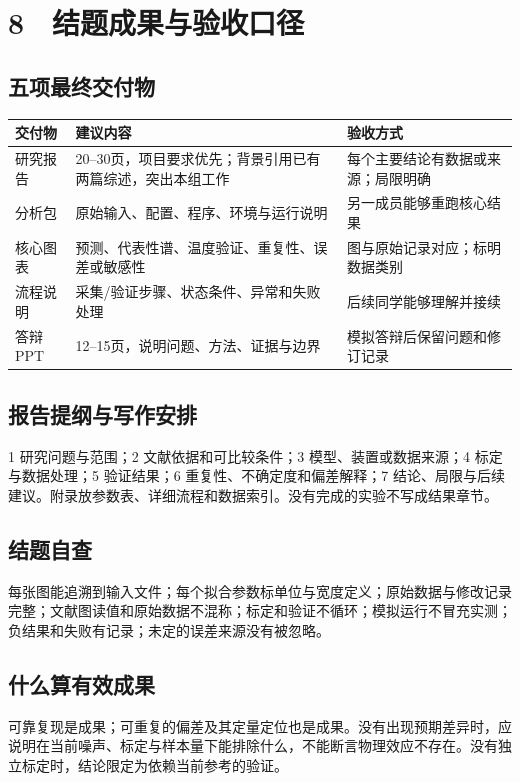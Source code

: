 \documentclass[UTF8,a4paper,11pt,fontset=fandol]{ctexart}
\begin{document}
\clearpage
\section*{8　结题成果与验收口径}
\subsection*{五项最终交付物}
\begin{longtable}{P{2.1cm}P{7.0cm}P{5.0cm}}
\toprule
\textbf{交付物} & \textbf{建议内容} & \textbf{验收方式}\\\midrule\endhead
研究报告 & 20–30页，项目要求优先；背景引用已有两篇综述，突出本组工作 & 每个主要结论有数据或来源；局限明确\\[0.35em]
分析包 & 原始输入、配置、程序、环境与运行说明 & 另一成员能够重跑核心结果\\[0.35em]
核心图表 & 预测、代表性谱、温度验证、重复性、误差或敏感性 & 图与原始记录对应；标明数据类别\\[0.35em]
流程说明 & 采集/验证步骤、状态条件、异常和失败处理 & 后续同学能够理解并接续\\[0.35em]
答辩PPT & 12–15页，说明问题、方法、证据与边界 & 模拟答辩后保留问题和修订记录\\[0.35em]
\bottomrule\end{longtable}
\subsection*{报告提纲与写作安排}
1 研究问题与范围；2 文献依据和可比较条件；3 模型、装置或数据来源；4 标定与数据处理；5 验证结果；6 重复性、不确定度和偏差解释；7 结论、局限与后续建议。附录放参数表、详细流程和数据索引。没有完成的实验不写成结果章节。

\subsection*{结题自查}
每张图能追溯到输入文件；每个拟合参数标单位与宽度定义；原始数据与修改记录完整；文献图读值和原始数据不混称；标定和验证不循环；模拟运行不冒充实测；负结果和失败有记录；未定的误差来源没有被忽略。

\subsection*{什么算有效成果}
可靠复现是成果；可重复的偏差及其定量定位也是成果。没有出现预期差异时，应说明在当前噪声、标定与样本量下能排除什么，不能断言物理效应不存在。没有独立标定时，结论限定为依赖当前参考的验证。
\end{document}
